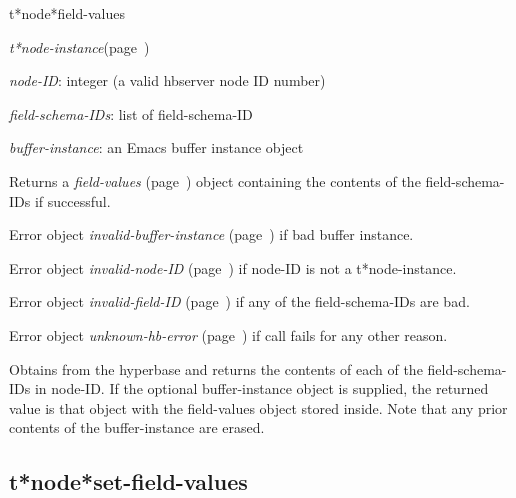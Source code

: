 \begin{description}
\item [Name:]  t*node*field-values

\item [Class:] {\sl t*node-instance}\hfill(page~\pageref{t*node-instance})

\item [Parameters:]
\item {\sl node-ID}:  
integer (a valid hbserver node ID number)

\item {\sl field-schema-IDs}:  list of field-schema-ID

\item {\sl buffer-instance}:  an Emacs buffer instance object


\item [Return-value:]
Returns a {\sl field-values} (page~\pageref{field-values}) object containing the 
contents of the field-schema-IDs if successful.

Error object {\sl invalid-buffer-instance} (page~\pageref{invalid-buffer-instance}) if bad 
buffer instance.

Error object {\sl invalid-node-ID} (page~\pageref{invalid-node-ID}) if node-ID is
not a t*node-instance.

Error object {\sl invalid-field-ID} (page~\pageref{invalid-field-ID}) if any of the 
field-schema-IDs are bad.

Error object {\sl unknown-hb-error} (page~\pageref{unknown-hb-error}) if call fails
for any other reason.

\item [Description:]

Obtains from the hyperbase and returns the contents
of each of the field-schema-IDs in node-ID. If the
optional buffer-instance object is supplied, the
returned value is that object with the field-values
object stored inside. Note that any prior contents
of the buffer-instance are erased.

\item [Public:]



\end{description}
\horizontalline

\subsection{t*node*set-field-values}
\label{t*node*set-field-values}

